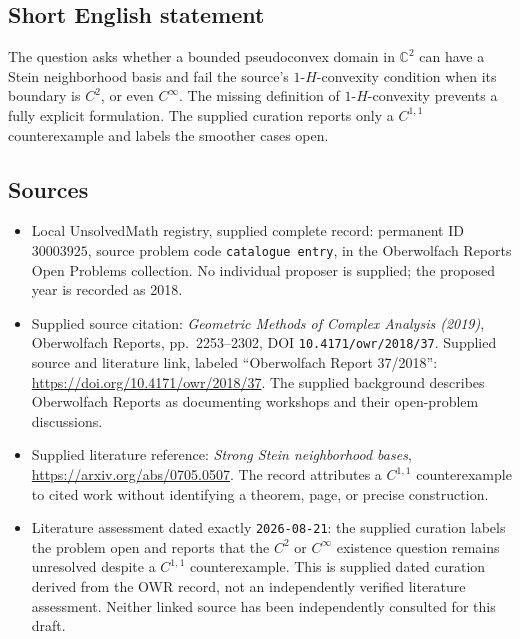 \documentclass[11pt]{article}
\newcommand{\C}{\mathbb{C}}
\begin{document}
\subsection{Short English statement}
The question asks whether a bounded pseudoconvex domain in \(\C^2\) can have a Stein neighborhood basis and fail the source's \(1\)-\(H\)-convexity condition when its boundary is \(C^2\), or even \(C^\infty\). The missing definition of \(1\)-\(H\)-convexity prevents a fully explicit formulation. The supplied curation reports only a \(C^{1,1}\) counterexample and labels the smoother cases open.
\subsection{Sources}
\begin{itemize}
\item Local UnsolvedMath registry, supplied complete record: permanent ID \(30003925\), source problem code \texttt{catalogue entry}, in the Oberwolfach Reports Open Problems collection. No individual proposer is supplied; the proposed year is recorded as 2018.
\item Supplied source citation: \emph{Geometric Methods of Complex Analysis (2019)}, Oberwolfach Reports, pp.\ 2253--2302, DOI \texttt{10.4171/owr/2018/37}. Supplied source and literature link, labeled ``Oberwolfach Report 37/2018'': \url{https://doi.org/10.4171/owr/2018/37}. The supplied background describes Oberwolfach Reports as documenting workshops and their open-problem discussions.
\item Supplied literature reference: \emph{Strong Stein neighborhood bases}, \url{https://arxiv.org/abs/0705.0507}. The record attributes a \(C^{1,1}\) counterexample to cited work without identifying a theorem, page, or precise construction.
\item Literature assessment dated exactly \texttt{2026-08-21}: the supplied curation labels the problem open and reports that the \(C^2\) or \(C^\infty\) existence question remains unresolved despite a \(C^{1,1}\) counterexample. This is supplied dated curation derived from the OWR record, not an independently verified literature assessment. Neither linked source has been independently consulted for this draft.
\end{itemize}
\end{document}

